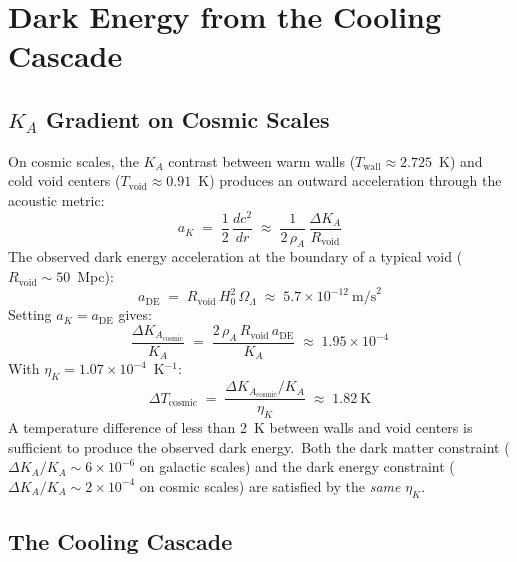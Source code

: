 \documentclass[12pt,letterpaper]{article}
\newcommand{\rhoa}{\rho_{\!A}}
\newcommand{\Ka}{K_{\!A}}
\newcommand{\etaK}{\eta_{\!K}}
\begin{document}
\section{Dark Energy from the Cooling Cascade}
\label{sec:dark-energy}

\subsection{\texorpdfstring{$\Ka$}{K\_A} Gradient on Cosmic Scales}

On cosmic scales, the $\Ka$ contrast between warm walls
($T_{\mathrm{wall}} \approx 2.725$~K) and cold void centers
($T_{\mathrm{void}} \approx 0.91$~K) produces an outward acceleration
through the acoustic metric:
%
\begin{equation}
  a_K \;=\; \frac{1}{2}\,\frac{dc^2}{dr}
    \;\approx\; \frac{1}{2\,\rhoa}\,\frac{\Delta\Ka}{R_{\mathrm{void}}}
  \label{eq:aK}
\end{equation}
%
The observed dark energy acceleration at the boundary of a typical void
($R_{\mathrm{void}} \sim 50$~Mpc):
%
\begin{equation}
  a_{\mathrm{DE}} \;=\; R_{\mathrm{void}}\,H_0^2\,\Omega_\Lambda
    \;\approx\; 5.7 \times 10^{-12}~\text{m/s}^2
  \label{eq:aDE}
\end{equation}
%
Setting $a_K = a_{\mathrm{DE}}$ gives:
%
\begin{equation}
  \frac{\Delta\Ka_{\mathrm{cosmic}}}{\Ka}
    \;=\; \frac{2\,\rhoa\,R_{\mathrm{void}}\,a_{\mathrm{DE}}}{\Ka}
    \;\approx\; 1.95 \times 10^{-4}
  \label{eq:DKA-cosmic}
\end{equation}
%
With $\etaK = 1.07 \times 10^{-4}$~K$^{-1}$:
%
\begin{equation}
  \Delta T_{\mathrm{cosmic}} \;=\;
    \frac{\Delta\Ka_{\mathrm{cosmic}}/\Ka}{\etaK}
    \;\approx\; 1.82~\text{K}
  \label{eq:DT-cosmic}
\end{equation}
%
A temperature difference of less than 2~K between walls and void centers
is sufficient to produce the observed dark energy.\ Both the dark matter
constraint ($\Delta\Ka/\Ka \sim 6 \times 10^{-6}$ on galactic scales) and
the dark energy constraint ($\Delta\Ka/\Ka \sim 2 \times 10^{-4}$ on cosmic
scales) are satisfied by the \emph{same} $\etaK$.


\subsection{The Cooling Cascade}
\end{document}
